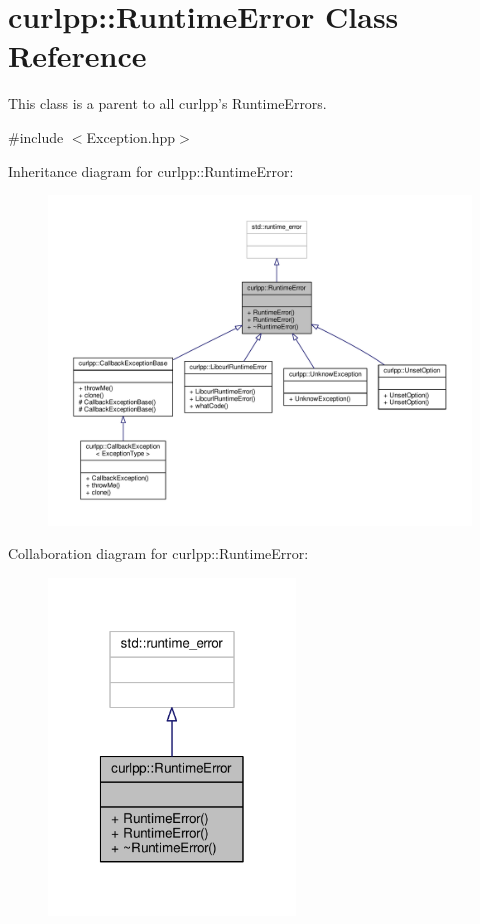 \hypertarget{classcurlpp_1_1RuntimeError}{\section{curlpp\-:\-:Runtime\-Error Class Reference}
\label{classcurlpp_1_1RuntimeError}
}


This class is a parent to all curlpp's Runtime\-Errors.  




{\ttfamily \#include $<$Exception.\-hpp$>$}



Inheritance diagram for curlpp\-:\-:Runtime\-Error\-:\nopagebreak
\begin{figure}[H]
\begin{center}
\leavevmode
\includegraphics[width=350pt]{classcurlpp_1_1RuntimeError__inherit__graph}
\end{center}
\end{figure}


Collaboration diagram for curlpp\-:\-:Runtime\-Error\-:\nopagebreak
\begin{figure}[H]
\begin{center}
\leavevmode
\includegraphics[width=186pt]{classcurlpp_1_1RuntimeError__coll__graph}
\end{center}
\end{figure}
